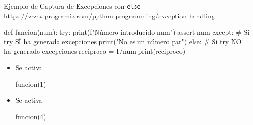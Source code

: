 \documentclass[10pt, envcountsect , spanish]{beamer}
\begin{document}
\begin{frame}[fragile]{Ejemplo de Captura de Excepciones con {\tt else}}
{\url{https://www.programiz.com/python-programming/exception-handling}}
\small
\hfil \begin{minipage}{.7\textwidth}
\begin{pyconsole}[][frame=single, fontsize=\scriptsize]
def funcion(num):
  try:
    print(f"Número introducido {num}")
    assert num %
  except:  # Si try SÍ ha generado excepciones
    print("No es un número par")
  else:    # Si try NO ha generado excepciones
    reciproco = 1/num
    print(reciproco)
    
\end{pyconsole}    
\end{minipage}

\begin{itemize}

\item Se activa 
\begin{pyconsole}[][frame=single, fontsize=\scriptsize]
funcion(1)
    
\end{pyconsole}   



\item Se activa 

\begin{pyconsole}[][frame=single, fontsize=\scriptsize]
funcion(4)
    
\end{pyconsole}   

\end{itemize}
\end{frame}
\end{document}
